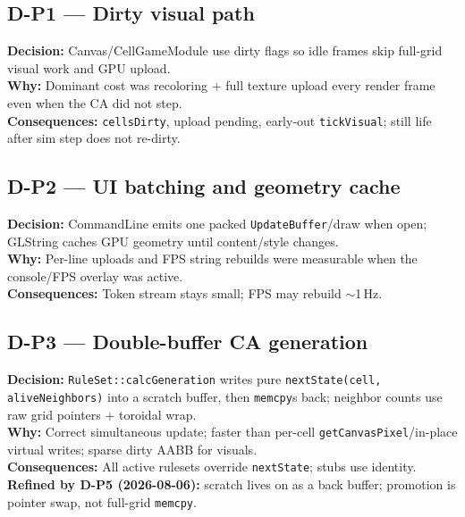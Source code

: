 \subsection*{D-P1 --- Dirty visual path}
\begin{decisionbox}[title={D-P1 \quad 2026-07-28}]
\textbf{Decision:} Canvas/CellGameModule use dirty flags so idle frames skip
full-grid visual work and GPU upload.\\
\textbf{Why:} Dominant cost was recoloring + full texture upload every render
frame even when the CA did not step.\\
\textbf{Consequences:} \texttt{cellsDirty}, upload pending, early-out
\texttt{tickVisual}; still life after sim step does not re-dirty.
\end{decisionbox}

\subsection*{D-P2 --- UI batching and geometry cache}
\begin{decisionbox}[title={D-P2 \quad 2026-07-28}]
\textbf{Decision:} CommandLine emits one packed \texttt{UpdateBuffer}/draw when
open; GLString caches GPU geometry until content/style changes.\\
\textbf{Why:} Per-line uploads and FPS string rebuilds were measurable when the
console/FPS overlay was active.\\
\textbf{Consequences:} Token stream stays small; FPS may rebuild $\sim$1\,Hz.
\end{decisionbox}

\subsection*{D-P3 --- Double-buffer CA generation}
\begin{decisionbox}[title={D-P3 \quad 2026-07-28}]
\textbf{Decision:} \texttt{RuleSet::calcGeneration} writes pure
\texttt{nextState(cell, aliveNeighbors)} into a scratch buffer, then
\texttt{memcpy}s back; neighbor counts use raw grid pointers + toroidal wrap.\\
\textbf{Why:} Correct simultaneous update; faster than per-cell
\texttt{getCanvasPixel}/in-place virtual writes; sparse dirty AABB for visuals.\\
\textbf{Consequences:} All active rulesets override \texttt{nextState}; stubs
use identity.\\
\textbf{Refined by D-P5 (2026-08-06):} scratch lives on 
as a back buffer; promotion is pointer swap, not full-grid \texttt{memcpy}.
\end{decisionbox}


